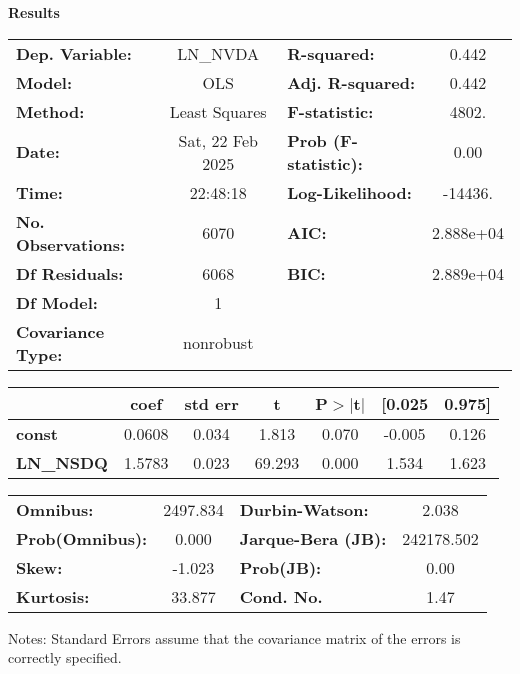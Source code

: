 \documentclass{beamer}
\begin{document}
\begin{frame}{\textbf{Results}}
	
\centering
	{\scriptsize\begin{tabular}{lclc}
	\toprule
	\textbf{Dep. Variable:}    &     LN\_NVDA     & \textbf{  R-squared:         } &     0.442   \\
	\textbf{Model:}            &       OLS        & \textbf{  Adj. R-squared:    } &     0.442   \\
	\textbf{Method:}           &  Least Squares   & \textbf{  F-statistic:       } &     4802.   \\
	\textbf{Date:}             & Sat, 22 Feb 2025 & \textbf{  Prob (F-statistic):} &     0.00    \\
	\textbf{Time:}             &     22:48:18     & \textbf{  Log-Likelihood:    } &   -14436.   \\
	\textbf{No. Observations:} &        6070      & \textbf{  AIC:               } & 2.888e+04   \\
	\textbf{Df Residuals:}     &        6068      & \textbf{  BIC:               } & 2.889e+04   \\
	\textbf{Df Model:}         &           1      & \textbf{                     } &             \\
	\textbf{Covariance Type:}  &    nonrobust     & \textbf{                     } &             \\
	\bottomrule
\end{tabular}
\begin{tabular}{lcccccc}
	& \textbf{coef} & \textbf{std err} & \textbf{t} & \textbf{P$> |$t$|$} & \textbf{[0.025} & \textbf{0.975]}  \\
	\midrule
	\textbf{const}    &       0.0608  &        0.034     &     1.813  &         0.070        &       -0.005    &        0.126     \\
	\textbf{LN\_NSDQ} &       1.5783  &        0.023     &    69.293  &         0.000        &        1.534    &        1.623     \\
	\bottomrule
\end{tabular}
\begin{tabular}{lclc}
	\textbf{Omnibus:}       & 2497.834 & \textbf{  Durbin-Watson:     } &     2.038   \\
	\textbf{Prob(Omnibus):} &   0.000  & \textbf{  Jarque-Bera (JB):  } & 242178.502  \\
	\textbf{Skew:}          &  -1.023  & \textbf{  Prob(JB):          } &      0.00   \\
	\textbf{Kurtosis:}      &  33.877  & \textbf{  Cond. No.          } &      1.47   \\
	\bottomrule
\end{tabular}


Notes: \newline
[1] Standard Errors assume that the covariance matrix of the errors is correctly specified.}
\end{frame}
\end{document}
